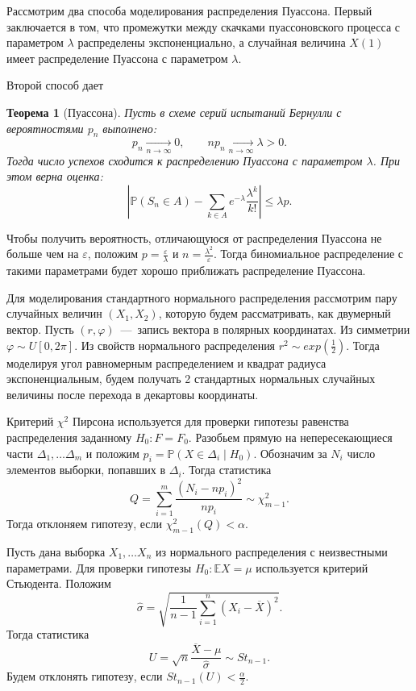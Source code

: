 \documentclass[12pt, a4paper]{article} %
\newtheorem{Th}{Теорема}
\renewcommand{\le}{\leqslant}
\renewcommand{\phi}{\varphi}
\renewcommand{\epsilon}{\varepsilon}
\def\Pro{\mathbb{P}} %
\def\Expec{\mathbb{E}} %
\begin{document}
Рассмотрим два способа моделирования распределения Пуассона.
Первый заключается в том, что промежутки между скачками пуассоновского 
процесса с параметром $\lambda$ распределены экспоненциально, 
а случайная величина  $X(1)$ имеет распределение Пуассона с параметром  $\lambda$.

Второй способ дает 
\begin{Th}[Пуассона]
    Пусть в схеме серий испытаний Бернулли с вероятностями $p_n$ выполнено:
     \[
        p_n \xrightarrow[n \rightarrow\infty]{} 0,\qquad 
        np_n \xrightarrow[n \rightarrow \infty]{} \lambda > 0.
    \]
    Тогда число успехов сходится к распределению Пуассона с параметром $\lambda$.
    При этом верна оценка:
     \[
         \left\lvert \Pro(S_n \in A) - \sum\limits_{k \in A} e^{-\lambda} \frac{\lambda^{k}}{k!}  \right\rvert \le \lambda p.
    \] 
\end{Th}
Чтобы получить вероятность, отличающуюся от распределения Пуассона не больше чем на $\epsilon$,
положим  $p = \frac{\epsilon}{\lambda}$ и $n = \frac{\lambda^2}{\epsilon}$. 
Тогда биномиальное распределение с такими параметрами будет хорошо приближать распределение Пуассона.

Для моделирования стандартного нормального распределения рассмотрим пару случайных величин $(X_1, X_2)$,
которую будем рассматривать, как двумерный вектор.
Пусть  $(r, \phi)$~---~запись вектора в полярных координатах.
Из симметрии $\phi \sim U[0, 2\pi]$.
Из свойств нормального распределения  $r^2 \sim exp(\frac{1}{2})$.
Тогда моделируя угол равномерным распределением и квадрат радиуса экспоненциальным, 
будем получать 2 стандартных нормальных случайных величины после перехода в декартовы координаты.

Критерий $\chi^2$ Пирсона используется для проверки гипотезы равенства распределения заданному $H_0\colon F = F_0$. 
Разобьем прямую на непересекающиеся части $\Delta_1,\ldots \Delta_m$ и
положим $p_i = \Pro(X \in \Delta_i \mid H_0)$.
Обозначим за $N_i$ число элементов выборки, попавших в $\Delta_i$.
Тогда статистика 
 \[
     Q = \sum\limits_{i=1}^{m} \frac{(N_i - np_i)^2}{np_i}
     \sim \chi^2_{m-1}.
\] 
Тогда отклоняем гипотезу, если $\chi^2_{m-1}(Q) < \alpha$.

Пусть дана выборка $X_1,\ldots X_n$ из нормального распределения с неизвестными параметрами.
Для проверки гипотезы $H_0\colon \Expec X = \mu$ используется критерий Стьюдента. 
Положим 
\[
    \hat{\sigma} = \sqrt{\frac{1}{n - 1} \sum\limits_{i=1}^{n} \left( X_i - \overline{X} \right)^2}.
\] 
Тогда статистика 
\[
    U = \sqrt{n} \frac{\overline{X} - \mu}{\hat{\sigma}}
    \sim St_{n-1}.
\] 
Будем отклонять гипотезу, если $St_{n-1}(U) < \frac{\alpha}{2}$.
\end{document}

